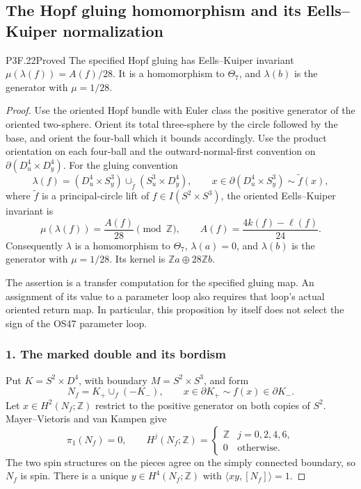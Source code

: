 \subsection{The Hopf gluing homomorphism and its Eells--Kuiper normalization}
\begin{statement}{P3F.22}{Proved}
The specified Hopf gluing has Eells--Kuiper invariant $\mu(\lambda(f))=A(f)/28$. It is a homomorphism to $\Theta_7$, and $\lambda(b)$ is the generator with $\mu=1/28$.
\end{statement}
\begin{proof}
Use the oriented Hopf bundle with Euler class the positive generator of the oriented two-sphere. Orient its total three-sphere by the circle followed by the base, and orient the four-ball which it bounds accordingly. Use the product orientation on each four-ball and the outward-normal-first convention on \(\partial(D^4_u\times D^4_y)\). For the gluing convention \[
 \lambda(f)=(D^4_u\times S^3_y)\cup_{\widetilde f}
                  (S^3_u\times D^4_y),
 \qquad x\in\partial(D^4_u\times S^3_y)
       \sim\widetilde f(x),
\] where \(\widetilde f\) is a principal-circle lift of \(f\in I(S^2\times S^3)\), the oriented Eells--Kuiper invariant is \[
 \mu(\lambda(f))=\frac{A(f)}{28}\pmod{\mathbb Z},
 \qquad A(f)=\frac{4k(f)-\ell(f)}{24}.                 \tag{P3F.22.1}
\] Consequently \(\lambda\) is a homomorphism to \(\Theta _7\), \(\lambda(a)=0\), and \(\lambda(b)\) is the generator with \(\mu=1/28\). Its kernel is \(\mathbb Za\oplus28\mathbb Zb\).

The assertion is a transfer computation for the specified gluing map. An assignment of its value to a parameter loop also requires that loop's actual oriented return map. In particular, this proposition by itself does not select the sign of the OS47 parameter loop.

\subsubsection{1. The marked double and its bordism}\label{the-marked-double-and-its-bordism}

Put \(K=S^2\times D^4\), with boundary \(M=S^2\times S^3\), and form \[
 N_f=K_+\cup_f(-K_-),\qquad x\in\partial K_+\sim f(x)\in\partial K_-.
\] Let \(x\in H^2(N_f;\mathbb Z)\) restrict to the positive generator on both copies of \(S^2\). Mayer--Vietoris and van Kampen give \[
 \pi_1(N_f)=0,\qquad H^j(N_f;\mathbb Z)=
 \begin{cases}\mathbb Z&j=0,2,4,6,\\0&\text{otherwise}.
 \end{cases}
\] The two spin structures on the pieces agree on the simply connected boundary, so \(N_f\) is spin. There is a unique \(y\in H^4(N_f;\mathbb Z)\) with \(\langle xy,[N_f]\rangle=1\).


\end{proof}
